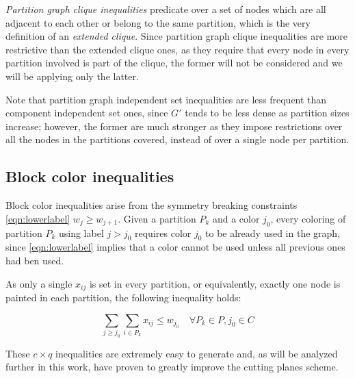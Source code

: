 \textit{Partition graph clique inequalities} predicate over a set of nodes which are all adjacent to each other or belong to the same partition, which is the very definition of an \textit{extended clique}. Since partition graph clique inequalities are more restrictive than the extended clique ones, as they require that every node in every partition involved is part of the clique, the former will not be considered and we will be applying only the latter.

Note that partition graph independent set inequalities are less frequent than component independent set ones, since $G'$ tends to be less dense as partition sizes increase; however, the former are much stronger as they impose restrictions over all the nodes in the partitions covered, instead of over a single node per partition.

\subsection{Block color inequalities}

Block color inequalities arise from the symmetry breaking constraints \ref{eqn:lowerlabel} $w_j \geq w_{j+1}$. Given a partition $P_k$ and a color $j_0$, every coloring of partition $P_k$ using label $j > j_0$ requires color $j_0$ to be already used in the graph, since \ref{eqn:lowerlabel} implies that a color cannot be used unless all previous ones had ben used. 

As only a single $x_{ij}$ is set in every partition, or equivalently, exactly one node is painted in each partition, the following inequality holds:

\begin{equation}
\label{ineq:blockcp}
\sum_{j \geq j_0} \sum_{i \in P_k} x_{ij} \leq w_{j_0} \quad \forall P_k \in P, j_0 \in C
\end{equation}

These $c \times q$ inequalities are extremely easy to generate and, as will be analyzed further in this work, have proven to greatly improve the cutting planes scheme.
